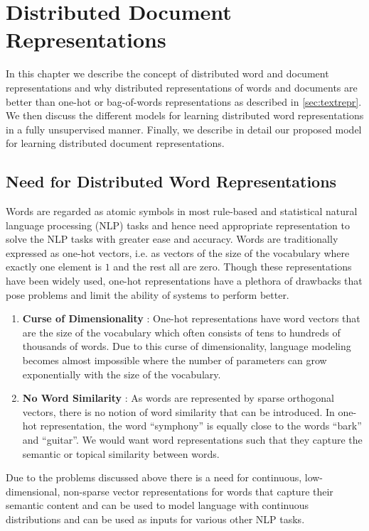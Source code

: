 \chapter{Distributed Document Representations}
\label{chapter:distembed}
In this chapter we describe the concept of distributed word and document representations and why distributed representations of words and documents are better than one-hot or bag-of-words representations as described in \ref{sec:textrepr}. We then discuss the different models for learning distributed word representations in a fully unsupervised manner. Finally, we describe in detail our proposed model for learning distributed document representations.

\section{Need for Distributed Word Representations}
\label{sec:motivation_distributed}
Words are regarded as atomic symbols in most rule-based and statistical natural language processing (NLP) tasks and hence need appropriate representation to solve the NLP tasks with greater ease and accuracy. 
Words are traditionally expressed as one-hot vectors, i.e. as vectors of the size of the vocabulary where exactly one element is $1$ and the rest all are zero.
Though these representations have been widely used, one-hot representations have a plethora of drawbacks that pose problems and limit the ability of systems to perform better. 
\begin{enumerate}
\item \textbf{Curse of Dimensionality} : One-hot representations have word vectors that are the size of the vocabulary which often consists of tens to hundreds of thousands of words. Due to this curse of dimensionality, language modeling becomes almost impossible where the number of parameters can grow exponentially with the size of the vocabulary.

\item \textbf{No Word Similarity} : As words are represented by sparse 
orthogonal vectors, there is no notion of word similarity that can be 
introduced. In one-hot representation, the word ``symphony'' is 
equally close to the words ``bark'' and ``guitar''. We would want word 
representations such that they capture the semantic or topical 
similarity between words.
\end{enumerate}

Due to the problems discussed above there is a need for continuous, 
low-dimensional, non-sparse vector representations for words that capture 
their semantic content and can be used to model language with 
continuous distributions and can be used as inputs for various other 
NLP tasks. 

